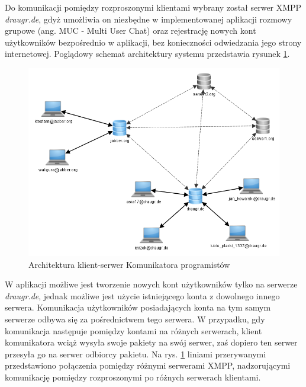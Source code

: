 \documentclass[polish,11pt,a4paper,twoside]{article}
\begin{document}
Do komunikacji pomiędzy rozproszonymi klientami wybrany został serwer XMPP \emph{draugr.de}, gdyż umożliwia on niezbędne w implementowanej aplikacji rozmowy grupowe (ang. MUC - Multi User Chat) oraz rejestrację nowych kont użytkowników bezpośrednio w aplikacji, bez konieczności odwiedzania jego strony internetowej. Poglądowy schemat architektury systemu przedstawia rysunek \ref{fig:architektura}.

\begin{figure}[!htb]
  \begin{center}
    \includegraphics[width=1.0\textwidth]{img/architektura.png}
    \caption{Architektura klient-serwer Komunikatora programistów} \label{fig:architektura} 
  \end{center}
\end{figure}

W aplikacji możliwe jest tworzenie nowych kont użytkowników tylko na serwerze \emph{draugr.de}, jednak możliwe jest użycie istniejącego konta z dowolnego innego serwera. Komunikacja użytkowników posiadających konta na tym samym serwerze odbywa się za pośrednictwem tego serwera. W przypadku, gdy komunikacja następuje pomiędzy kontami na różnych serwerach, klient komunikatora wciąż wysyła swoje pakiety na swój serwer, zaś dopiero ten serwer przesyła go na serwer odbiorcy pakietu. Na rys. \ref{fig:architektura} liniami przerywanymi przedstawiono połączenia pomiędzy różnymi serwerami XMPP, nadzorującymi komunikację pomiędzy rozproszonymi po różnych serwerach klientami.

\end{document}
